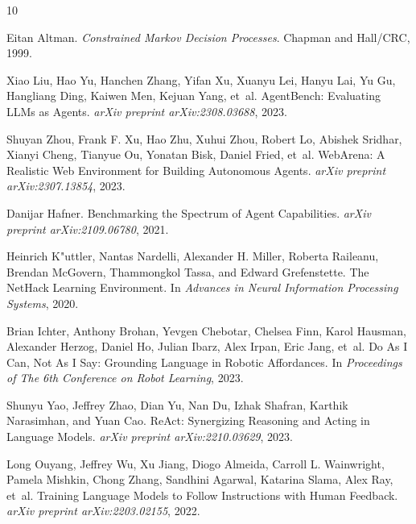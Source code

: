 \begin{thebibliography}{10}

Eitan Altman.
\newblock \emph{Constrained Markov Decision Processes}.
\newblock Chapman and Hall/CRC, 1999.

Xiao Liu, Hao Yu, Hanchen Zhang, Yifan Xu, Xuanyu Lei, Hanyu Lai, Yu Gu, Hangliang Ding, Kaiwen Men, Kejuan Yang, et~al.
\newblock AgentBench: Evaluating LLMs as Agents.
\newblock \emph{arXiv preprint arXiv:2308.03688}, 2023.

Shuyan Zhou, Frank F. Xu, Hao Zhu, Xuhui Zhou, Robert Lo, Abishek Sridhar, Xianyi Cheng, Tianyue Ou, Yonatan Bisk, Daniel Fried, et~al.
\newblock WebArena: A Realistic Web Environment for Building Autonomous Agents.
\newblock \emph{arXiv preprint arXiv:2307.13854}, 2023.

Danijar Hafner.
\newblock Benchmarking the Spectrum of Agent Capabilities.
\newblock \emph{arXiv preprint arXiv:2109.06780}, 2021.

Heinrich K{"u}ttler, Nantas Nardelli, Alexander H. Miller, Roberta Raileanu, Brendan McGovern, Thammongkol Tassa, and Edward Grefenstette.
\newblock The NetHack Learning Environment.
\newblock In \emph{Advances in Neural Information Processing Systems}, 2020.

Brian Ichter, Anthony Brohan, Yevgen Chebotar, Chelsea Finn, Karol Hausman, Alexander Herzog, Daniel Ho, Julian Ibarz, Alex Irpan, Eric Jang, et~al.
\newblock Do As I Can, Not As I Say: Grounding Language in Robotic Affordances.
\newblock In \emph{Proceedings of The 6th Conference on Robot Learning}, 2023.

Shunyu Yao, Jeffrey Zhao, Dian Yu, Nan Du, Izhak Shafran, Karthik Narasimhan, and Yuan Cao.
\newblock ReAct: Synergizing Reasoning and Acting in Language Models.
\newblock \emph{arXiv preprint arXiv:2210.03629}, 2023.

Long Ouyang, Jeffrey Wu, Xu Jiang, Diogo Almeida, Carroll L. Wainwright, Pamela Mishkin, Chong Zhang, Sandhini Agarwal, Katarina Slama, Alex Ray, et~al.
\newblock Training Language Models to Follow Instructions with Human Feedback.
\newblock \emph{arXiv preprint arXiv:2203.02155}, 2022.


\end{thebibliography}
